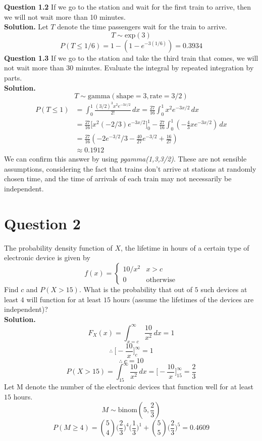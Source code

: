 \documentclass[
]{book}
\begin{document}
\textbf{Question 1.2} If we go to the station and wait for the first train to arrive, then we will not wait more than 10 minutes.\\
\textbf{Solution.} Let \(T\) denote the time passengers wait for the train to arrive.
\[T \sim \text{exp}(3)\]
\[P(T \leq 1/6) = 1 - (1-e^{-3(1/6)}) = 0.3934\]
\textbf{Question 1.3} If we go to the station and take the third train that comes, we will not wait more than 30 minutes. Evaluate the integral by repeated integration by parts.\\
\textbf{Solution.} \[T \sim \text{gamma}(\text{shape} = 3, \text{rate} = 3/2)\]
\[\begin{aligned}
P(T \leq 1) &= \int_0^1 \frac{(3/2)^3x^2 e^{-3x/2}}{2!} \,dx = \frac{27}{16} \int_0^1 x^2 e^{-3x/2} \,dx \\
&= \frac{27}{16}\bigg[x^2(-2/3)e^{-3x/2}\bigg]_0^1 - \frac{27}{16} \int_0^1 (-\frac{4}{3}xe^{-3x/2}) \,dx \\
&= \frac{27}{16}(-2e^{-3/2}/3 - \frac{40}{27}e^{-3/2} + \frac{16}{27}) \\[0.3em]
&\approx 0.1912
\end{aligned}\]
We can confirm this answer by using \emph{pgamma(1,3,3/2)}.
These are not sensible assumptions, considering the fact that trains don't arrive at stations at randomly chosen time, and the time of arrivals of each train may not necessarily be independent.

\section{Question 2}\label{question-2-3}

The probability density function of \(X\), the lifetime in hours of a certain type of electronic device is given by
\[f(x) = \begin{cases} 10/x^2 & x > c \\ 0 & \text{otherwise} \end{cases}\]
Find \(c\) and \(P(X > 15)\). What is the probability that out of \(5\) such devices at least \(4\) will function for at least \(15\) hours (assume the lifetimes of the devices are independent)?\\
\textbf{Solution.} \[F_X(x) = \int_{x=c}^{\infty} \frac{10}{x^2} \,dx = 1\]
\[\therefore \ \bigg[-\frac{10}{x} \bigg]_c^\infty = 1\]
\[\therefore \ c = 10\]
\[P(X > 15) = \int_{15}^{\infty} \frac{10}{x^2} \,dx = \bigg[-\frac{10}{x} \bigg]_{15}^\infty = \frac{2}{3}\]
Let M denote the number of the electronic devices that function well for at least \(15\) hours.
\[M \sim \text{binom}(5, \frac{2}{3})\]
\[P(M \geq 4) = \binom{5}{4}\bigg(\frac{2}{3}\bigg)^4\bigg(\frac{1}{3}\bigg)^1 + \binom{5}{5}\bigg(\frac{2}{3}\bigg)^5 = 0.4609\]
\end{document}

